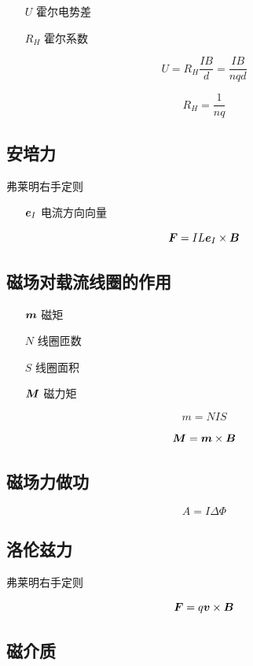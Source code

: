 \documentclass{article}
\begin{document}
\begin{enumerate}
    \item [$U$] 霍尔电势差
    \item [$R_H$] 霍尔系数
\end{enumerate}

\[U=R_H\frac{IB}d=\frac{IB}{nqd}\]

\[R_H=\frac1{nq}\]

\subsection{安培力}

弗莱明右手定则

\begin{enumerate}
    \item [$\boldsymbol{e}_I$] 电流方向向量
\end{enumerate}

\[\boldsymbol{F}=IL\boldsymbol{e}_I\times\boldsymbol{B}\]

\subsection{磁场对载流线圈的作用}

\begin{enumerate}
    \item [$\boldsymbol{m}$] 磁矩
    \item [$N$] 线圈匝数
    \item [$S$] 线圈面积
    \item [$\boldsymbol{M}$] 磁力矩
\end{enumerate}

\[m=NIS\]

\[\boldsymbol{M}=\boldsymbol{m}\times\boldsymbol{B}\]

\subsection{磁场力做功}

\[A=I\Delta\Phi\]

\subsection{洛伦兹力}

弗莱明右手定则

\[\boldsymbol{F}=q\boldsymbol{v}\times\boldsymbol{B}\]

\subsection{磁介质}
\end{document}
